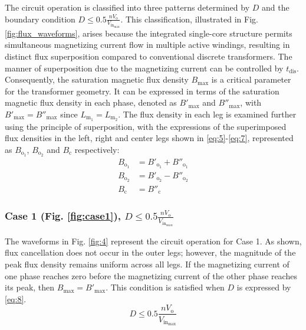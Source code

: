 \documentclass[lettersize,journal]{IEEEtran}
\begin{document}
The circuit operation is classified into three patterns determined by $D$ and the boundary condition $D \le 0.5 \frac{n V_{\mathrm{o}}}{V_{\mathrm{in}_{\mathrm{max}}}}$. This classification, illustrated in Fig. \ref{fig:flux_waveforms}, arises because the integrated single-core structure permits simultaneous magnetizing current flow in multiple active windings, resulting in distinct flux superposition compared to conventional discrete transformers. The manner of superposition due to the magnetizing current can be controlled by $t_{\mathrm{dis}}$. Consequently, the saturation magnetic flux density $B_{\mathrm{max}}$ is a critical parameter for the transformer geometry. It can be expressed in terms of the saturation magnetic flux density in each phase, denoted as $B'_{\mathrm{max}}$ and $B''_{\mathrm{max}}$, with $B'_{\mathrm{max}} = B''_{\mathrm{max}}$ since $L_{\mathrm{m}_1} = L_{\mathrm{m}_2}$. The flux density in each leg is examined further using the principle of superposition, with the expressions of the superimposed flux densities in the left, right and center legs shown in \eqref{eq:5}-\eqref{eq:7}, represented as $B_{\mathrm{o}_1}$, $B_{\mathrm{o}_2}$ and $B_{\mathrm{c}}$ respectively:
\begin{align}
B_{\mathrm{o}_1} &= B'_{\mathrm{o}_1} + B''_{\mathrm{o}_1} \label{eq:5}\\
B_{\mathrm{o}_2} &= B'_{\mathrm{o}_2} - B''_{\mathrm{o}_2} \label{eq:6}\\
B_{\mathrm{c}} &= B''_{\mathrm{c}} \label{eq:7}
\end{align}

\subsubsection*{\textup{Case 1 (Fig. \ref{fig:case1}),  $D \le 0.5 \frac{n V_{\mathrm{o}}}{V_{\mathrm{in}_{\mathrm{max}}}}$}}
The waveforms in Fig. \ref{fig:4} represent the circuit operation for Case 1. As shown, flux cancellation does not occur in the outer legs; however, the magnitude of the peak flux density remains uniform across all legs. If the magnetizing current of one phase reaches zero before the magnetizing current of the other phase reaches its peak, then $B_{\mathrm{max}} =  B'_{\mathrm{max}}$. This condition is satisfied when $D$ is expressed by \eqref{eq:8}.
\begin{equation}
\label{eq:8}
D \le 0.5 \frac{n V_{\mathrm{o}}}{V_{\mathrm{in}_{\mathrm{max}}}}
\end{equation}
\end{document}

